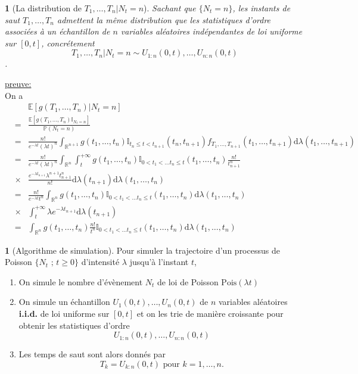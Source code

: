 \documentclass[8pt,notheorems]{beamer}
\def \P {\mathbb P}
\newtheorem{prop}{\translate{Proposition}}
\theoremstyle{definition}
\theoremstyle{example}
\theoremstyle{mystyle}
\newtheorem{remark}{\translate{Remarque}}
\theoremstyle{plain}
\begin{document}
\begin{frame}[allowframebreaks]
\begin{prop}[La distribution de $T_1,\ldots,T_n|N_t=n$]
Sachant que  $\{N_t=n\}$, les instants de saut $T_1,\ldots,T_n$ admettent la même distribution que les statistiques d'ordre associées à un échantillon de $n$ variables aléatoires indépendantes de loi uniforme sur $[0,t]$, concrétement
$$T_1,\ldots,T_n|N_t=n\sim U_{1:n}(0,t),\ldots, U_{n:n}(0,t)$$.
\end{prop}
\underline{preuve:}\\
On a 
\begin{eqnarray*}
&&\mathbb{E}\left[g(T_1,\ldots, T_n)|N_t = n\right]\\
&=&\frac{\mathbb{E}\left[g(T_1,\ldots, T_n)\mathbb{I}_{N_t = n}\right]}{\P(N_t = n)}\\
&=&\frac{n!}{e^{-\lambda t}(\lambda t)^n}\int_{\mathbb{R}^{n+1}}g(t_1,\ldots, t_n)\mathbb{I}_{t_n\leq t<t_{n+1}}(t_n,t_{n+1})f_{T_1,\ldots, T_{n+1}}(t_1,\ldots, t_{n+1})\text{d}\lambda(t_1,\ldots, t_{n+1})\\
&=&\frac{n!}{e^{-\lambda t}(\lambda t)^n}\int_{\mathbb{R}^{n}}\int_{t}^{+\infty}g(t_1,\ldots, t_n)\mathbb{I}_{0<t_1<\ldots t_n\leq t}(t_1,\ldots,t_{n})\frac{n!}{t_{n+1}^n}\\
&\times &\frac{e^{-\lambda t_{n+1}}\lambda^{n+1}t_{n+1}^n}{n!}\text{d}\lambda(t_{n+1})\text{d}\lambda(t_1,\ldots,t_{n} )\\
&=&\frac{n!}{e^{-\lambda t} t^n}\int_{\mathbb{R}^{n}}g(t_1,\ldots, t_n)\mathbb{I}_{0<t_1<\ldots t_n\leq t}(t_1,\ldots,t_{n})\text{d}\lambda(t_1,\ldots,t_{n} )\\
&\times&\int_{t}^{+\infty}\lambda e^{-\lambda t_{n+1}}\text{d}\lambda(t_{n+1})\\
 &=&\int_{\mathbb{R}^{n}}g(t_1,\ldots, t_n)\frac{n!}{t^n}\mathbb{I}_{0<t_1<\ldots t_n\leq t}(t_1,\ldots,t_{n})\text{d}\lambda(t_1,\ldots,t_{n} )
\end{eqnarray*}
\begin{remark}[Algorithme de simulation]
Pour simuler la trajectoire d'un processus de Poisson $\{N_t\text{ ; }t\geq0\}$ d'intensité $\lambda$ jusqu'à l'instant $t$,
\begin{enumerate}
\item On simule le nombre d'évènement $N_t$ de loi de Poisson $\text{Pois}(\lambda t)$
\item On simule un échantillon $U_1(0,t),\ldots, U_n(0,t)$ de $n$ variables aléatoires \textbf{i.i.d.} de loi uniforme sur $[0,t]$ et on les trie de manière croissante pour obtenir les statistiques d'ordre $$U_{1:n}(0,t),\ldots, U_{n:n}(0,t)$$
\item Les temps de saut sont alors donnés par $$T_k=U_{k:n}(0,t)\text{ pour }k=1,\ldots, n.$$
\end{enumerate}
\end{remark}
\end{frame}
\end{document}
